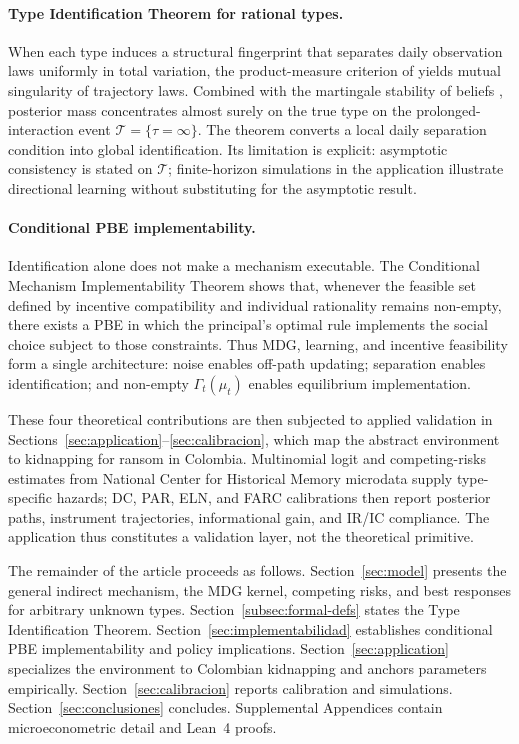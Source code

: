 \documentclass[review,authoryear,12pt]{elsarticle}
\theoremstyle{plain}
\theoremstyle{definition}
\newcommand{\1}{\mathbf{1}}
\begin{document}
\paragraph{Type Identification Theorem for rational types.}
When each type induces a structural fingerprint that separates daily observation laws uniformly in total variation, the product-measure criterion of \citet{Kakutani1948} yields mutual singularity of trajectory laws. Combined with the martingale stability of beliefs \citep{Doob1953Stochastic,BlackwellDubins1962}, posterior mass concentrates almost surely on the true type on the prolonged-interaction event $\mathcal{T}=\{\tau=\infty\}$. The theorem converts a local daily separation condition into global identification. Its limitation is explicit: asymptotic consistency is stated on $\mathcal{T}$; finite-horizon simulations in the application illustrate directional learning without substituting for the asymptotic result.

\paragraph{Conditional PBE implementability.}
Identification alone does not make a mechanism executable. The Conditional Mechanism Implementability Theorem shows that, whenever the feasible set defined by incentive compatibility and individual rationality remains non-empty, there exists a PBE in which the principal's optimal rule implements the social choice subject to those constraints. Thus MDG, learning, and incentive feasibility form a single architecture: noise enables off-path updating; separation enables identification; and non-empty $\Gamma_t(\mu_t)$ enables equilibrium implementation.

These four theoretical contributions are then subjected to applied validation in Sections~\ref{sec:application}--\ref{sec:calibracion}, which map the abstract environment to kidnapping for ransom in Colombia. Multinomial logit and competing-risks estimates from National Center for Historical Memory microdata supply type-specific hazards; DC, PAR, ELN, and FARC calibrations then report posterior paths, instrument trajectories, informational gain, and IR/IC compliance. The application thus constitutes a validation layer, not the theoretical primitive.

The remainder of the article proceeds as follows. Section~\ref{sec:model} presents the general indirect mechanism, the MDG kernel, competing risks, and best responses for arbitrary unknown types. Section~\ref{subsec:formal-defs} states the Type Identification Theorem. Section~\ref{sec:implementabilidad} establishes conditional PBE implementability and policy implications. Section~\ref{sec:application} specializes the environment to Colombian kidnapping and anchors parameters empirically. Section~\ref{sec:calibracion} reports calibration and simulations. Section~\ref{sec:conclusiones} concludes. Supplemental Appendices contain microeconometric detail and Lean~4 proofs.
\end{document}
